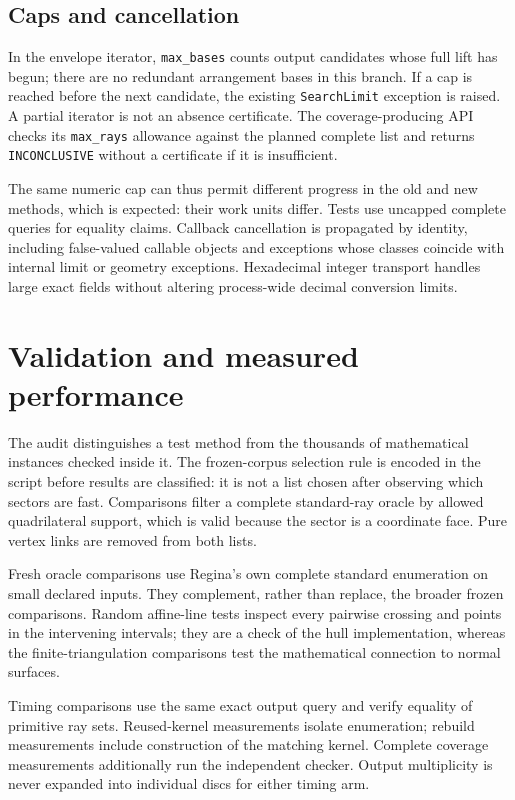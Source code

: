 \documentclass[11pt]{article}
\theoremstyle{definition}
\theoremstyle{remark}
\begin{document}
\subsection{Caps and cancellation}

In the envelope iterator, \texttt{max\_bases} counts output candidates whose
full lift has begun; there are no redundant arrangement bases in this branch.
If a cap is reached before the next candidate, the existing
\texttt{SearchLimit} exception is raised. A partial iterator is not an
absence certificate. The coverage-producing API checks its \texttt{max\_rays}
allowance against the planned complete list and returns
\texttt{INCONCLUSIVE} without a certificate if it is insufficient.

The same numeric cap can thus permit different progress in the old and new
methods, which is expected: their work units differ. Tests use uncapped
complete queries for equality claims. Callback cancellation is propagated
by identity, including false-valued callable objects and exceptions whose
classes coincide with internal limit or geometry exceptions. Hexadecimal
integer transport handles large exact fields without altering process-wide
decimal conversion limits.

\section{Validation and measured performance}
\label{sec:experiments}




The audit distinguishes a test method from the thousands of mathematical
instances checked inside it. The frozen-corpus selection rule is encoded in
the script before results are classified: it is not a list chosen after
observing which sectors are fast. Comparisons filter a complete standard-ray
oracle by allowed quadrilateral support, which is valid because the sector
is a coordinate face. Pure vertex links are removed from both lists.

Fresh oracle comparisons use Regina's own complete standard enumeration on
small declared inputs. They complement, rather than replace, the broader
frozen comparisons. Random affine-line tests inspect every pairwise crossing
and points in the intervening intervals; they are a check of the hull
implementation, whereas the finite-triangulation comparisons test the
mathematical connection to normal surfaces.

Timing comparisons use the same exact output query and verify equality of
primitive ray sets. Reused-kernel measurements isolate enumeration; rebuild
measurements include construction of the matching kernel. Complete coverage
measurements additionally run the independent checker. Output multiplicity
is never expanded into individual discs for either timing arm.
\end{document}

